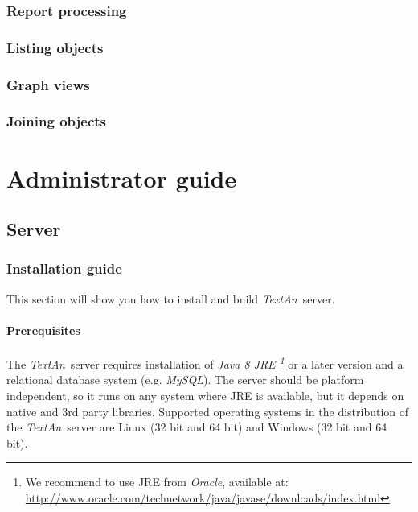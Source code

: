 \documentclass[12pt,a4paper]{report}
\newcommand{\textan}{\emph{TextAn}}
\begin{document}
\subsection{Report processing}

\subsection{Listing objects}

\subsection{Graph views}

\subsection{Joining objects}

\chapter{Administrator guide}


\section{Server}

\subsection{Installation guide}


This section will show you how to install and build \textan\ server. 

\subsubsection{Prerequisites}
\label{sssec:SerInstPre}

The \textan\ server requires installation of \emph{Java 8 JRE
\footnote{We recommend to use JRE from \emph{Oracle}, available at: \url{http://www.oracle.com/technetwork/java/javase/downloads/index.html}}}
or a later version and a relational database system (e.g. \emph{MySQL}).
The server should be platform independent, so it runs on any system where JRE is available,
but it depends on native and 3rd party libraries. 
Supported operating systems in the distribution of the \textan\ server are
Linux (32 bit and 64 bit) and Windows (32 bit and 64 bit). %
\end{document}
